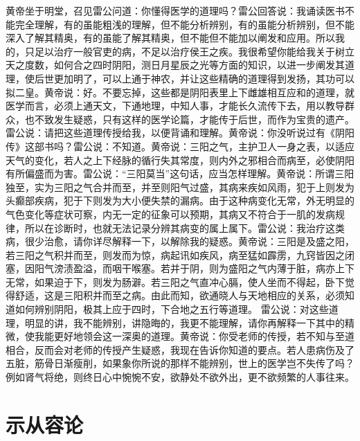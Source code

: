 \documentclass[a4paper,12pt,UTF8,twoside]{ctexbook}
\begin{document}
黄帝坐于明堂，召见雷公问道：你懂得医学的道理吗？雷公回答说：我诵读医书不能完全理解，有的虽能粗浅的理解，但不能分析辨别，有的虽能分析辨别，但不能深入了解其精奥，有的虽能了解其精奥，但不能但不能加以阐发和应用。所以我的，只足以治疗一般官吏的病，不足以治疗侯王之疾。我很希望你能给我关于树立天之度数，如何合之四时阴阳，测日月星辰之光等方面的知识，以进一步阐发其道理，使后世更加明了，可以上通于神农，并让这些精确的道理得到发扬，其功可以拟二皇。黄帝说：好。不要忘掉，这些都是阴阳表里上下雌雄相互应和的道理，就医学而言，必须上通天文，下通地理，中知人事，才能长久流传下去，用以教导群众，也不致发生疑惑，只有这样的医学论篇，才能传于后世，而作为宝贵的遗产。
雷公说：请把这些道理传授给我，以便背诵和理解。黄帝说：你没听说过有《阴阳传》这部书吗？雷公说：不知道。黄帝说：三阳之气，主护卫人一身之表，以适应天气的变化，若人之上下经脉的循行失其常度，则内外之邪相合而病至，必使阴阳有所偏盛而为害。雷公说：“三阳莫当”这句话，应当怎样理解。黄帝说：所谓三阳独至，实为三阳之气合并而至，并至则阳气过盛，其病来疾如风雨，犯于上则发为头癫部疾病，犯于下则发为大小便失禁的漏病。由于这种病变化无常，外无明显的气色变化等症状可察，内无一定的征象可以预期，其病又不符合于一肌的发病规律，所以在诊断时，也就无法记录分辨其病变的属上属下。雷公说：我治疗这类病，很少治愈，请你详尽解释一下，以解除我的疑惑。黄帝说：三阳是及盛之阳，若三阳之气积并而至，则发而为惊，病起讯如疾风，病至猛如霹雳，九窍皆因之闭塞，因阳气滂渍盈溢，而咽干喉塞。若并于阴，则为盛阳之气内薄于脏，病亦上下无常，如果迫于下，则发为肠澼。若三阳之气直冲心膈，使人坐而不得起，卧下觉得舒适，这是三阳积并而至之病。由此而知，欲通晓人与天地相应的关系，必须知道如何辨别阴阳，极其上应于四时，下合地之五行等道理。
雷公说：对这些道理，明显的讲，我不能辨别，讲隐晦的，我更不能理解，请你再解释一下其中的精微，使我能更好地领会这一深奥的道理。黄帝说：你受老师的传授，若不知与至道相合，反而会对老师的传授产生疑惑，我现在告诉你知道的要点。若人患病伤及了五脏，筋骨日渐瘦削，如果象你所说的那样不能辨别，世上的医学岂不失传了吗？例如肾气将绝，则终日心中惋惋不安，欲静处不欲外出，更不欲频繁的人事往来。

\chapter{示从容论}
\end{document}

